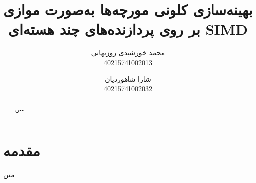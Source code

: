 \documentclass[a4paper,10pt]{article}
\title{\huge بهینه‌سازی کلونی مورچه‌ها به‌صورت موازی بر روی پردازنده‌های چند هسته‌ای SIMD}
\author{محمد خورشیدی روزبهانی\\40215741002013 \and شارا شاهوردیان\\40215741002032}
\date{}
\begin{document}
    \maketitle


    \begin{abstract}
        
        متن

    \end{abstract}


    \section{مقدمه}

        متن
\end{document}
